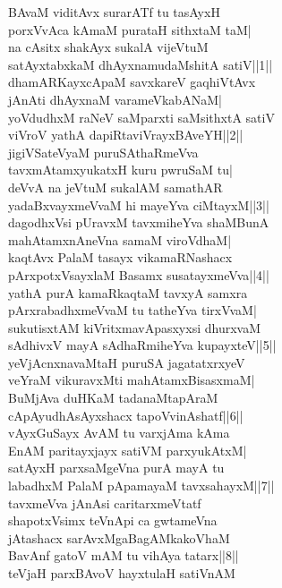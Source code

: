 \documentclass{article}
\begin{document}
BAvaM viditAvx surarATf tu tasAyxH\\
porxVvAca kAmaM purataH sithxtaM taM|\\
na cAsitx shakAyx sukalA vijeVtuM\\
satAyxtabxkaM dhAyxnamudaMshitA satiV||1||\\
dhamARKayxcApaM savxkareV gaqhiVtAvx\\
jAnAti dhAyxnaM varameVkabANaM|\\
yoVdudhxM raNeV saMparxti saMsithxtA satiV\\
viVroV yathA dapiRtaviVrayxBAveYH||2||\\
jigiVSateVyaM puruSAthaRmeVva\\
tavxmAtamxyukatxH kuru pwruSaM tu|\\
deVvA na jeVtuM sukalAM samathAR\\
yadaBxvayxmeVvaM hi mayeYva ciMtayxM||3||\\
dagodhxVsi pUravxM tavxmiheYva shaMBunA\\
mahAtamxnAneVna samaM viroVdhaM|\\
kaqtAvx PalaM tasayx vikamaRNashacx\\
pArxpotxVsayxlaM Basamx susatayxmeVva||4||\\
yathA purA kamaRkaqtaM tavxyA samxra\\
pArxrabadhxmeVvaM tu tatheYva tirxVvaM|\\
sukutisxtAM kiVritxmavApasxyxsi dhurxvaM\\
sAdhivxV mayA sAdhaRmiheYva kupayxteV||5||\\
yeVjAcnxnavaMtaH puruSA jagatatxrxyeV\\
veYraM vikuravxMti mahAtamxBisasxmaM|\\
BuMjAva duHKaM tadanaMtapAraM\\
cApAyudhAsAyxshacx tapoVvinAshatf||6||\\
vAyxGuSayx AvAM tu varxjAma kAma\\
EnAM paritayxjayx satiVM parxyukAtxM|\\
satAyxH parxsaMgeVna purA mayA tu\\
labadhxM PalaM pApamayaM tavxsahayxM||7||\\
tavxmeVva jAnAsi caritarxmeVtatf\\
shapotxVsimx teVnApi ca gwtameVna\\
jAtashacx sarAvxMgaBagAMkakoVhaM\\
BavAnf gatoV mAM tu vihAya tatarx||8||\\
teVjaH parxBAvoV hayxtulaH satiVnAM\\
\end{document}
